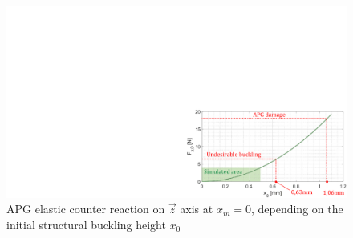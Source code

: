 \documentclass[3p,twocolumn,preprint]{elsarticle}
\begin{document}
\begin{figure}[!htbp]
	\centering
	\captionsetup{justification=centering}
	\includegraphics[trim={17.9cm 0cm 0cm 10cm},clip,width=0.9\linewidth]{figures/buckling_limit.pdf}
	\caption{APG elastic counter reaction on $\vec{z}$ axis at $x_m=0$, depending on the initial structural buckling height $x_0$}
	\label{fig:buckling_limit}
\end{figure}

\end{document}
